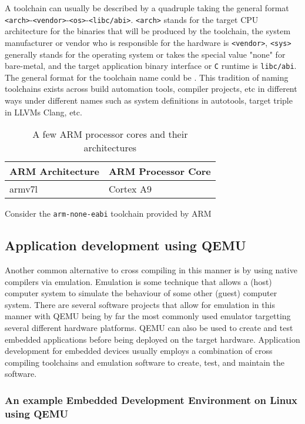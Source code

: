 A toolchain can usually be described by a quadruple taking the general format \texttt{<arch>}-\texttt{<vendor>}-\texttt{<os>}-\texttt{<libc/abi>}. \texttt{<arch>} stands for the target CPU architecture for the binaries that will be produced by the toolchain, the system manufacturer or vendor who is responsible for the hardware is \texttt{<vendor>}, \texttt{<sys>} generally stands for the operating system or takes the special value "none" for bare-metal, and the target application binary interface or \texttt{C} runtime is \texttt{libc/abi}. The general format for the toolchain name could be . This tradition of naming toolchains exists across build automation tools, compiler projects, etc in different ways under different names such as system definitions in autotools, target triple in LLVM\textquotesingle s Clang, etc.

\begin{table}[h]
	\centering
	\begin{tabular}{ |p{9em}|p{14em}| }
		\hline
			\textbf{ARM Architecture} & \textbf{ARM Processor Core} \\
		\hline
			armv7l & Cortex A9 \\
		\hline
	\end{tabular}
	\caption{A few ARM processor cores and their architectures}
	\label{table:arm}
\end{table}

Consider the \texttt{arm-none-eabi} toolchain provided by ARM


\subsection{Application development using QEMU}

Another common alternative to cross compiling in this manner is by using native compilers via emulation. Emulation is some technique that allows a (host) computer system to simulate the behaviour of some other (guest) computer system. There are several software projects that allow for emulation in this manner with QEMU being by far the most commonly used emulator targetting several different hardware platforms. QEMU can also be used to create and test embedded applications before being deployed on the target hardware. Application development for embedded devices usually employs a combination of cross compiling toolchains and emulation software to create, test, and maintain the software.

\subsubsection{An example Embedded Development Environment on Linux using QEMU}

